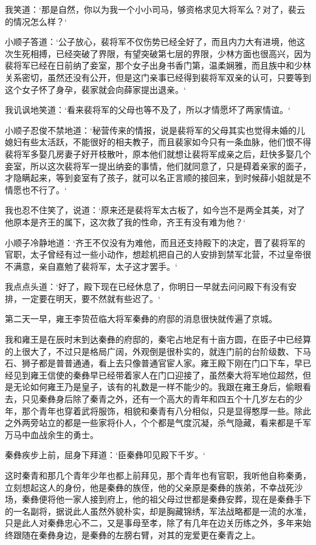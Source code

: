 我笑道：‘那是自然，你以为我一个小小司马，够资格求见大将军么？对了，裴云的情况怎么样？‘

小顺子答道：‘公子放心，裴将军不仅伤势已经全好了，而且内力大有进境，他这次生死相搏，已经突破了界限，有望突破第七层的界限，少林方面也很高兴，因为裴将军已经在日前纳了妾室，那个女子出身书香门第，温柔娴雅，而且族中和少林关系密切，虽然还没有公开，但是这门亲事已经得到裴将军双亲的认可，只要等到这个女子怀了身孕，裴家就会向薛家提出退亲。‘

我讥讽地笑道：‘看来裴将军的父母也等不及了，所以才情愿坏了两家情谊。‘

小顺子忍俊不禁地道：‘秘营传来的情报，说是裴将军的父母其实也觉得未婚的儿媳妇有些太活跃，不能很好的相夫教子，而且裴家如今只有一条血脉，他们恨不得裴将军多娶几房妻子好开枝散叶，原本他们就想让裴将军成亲之后，赶快多娶几个妾室，所以这次裴将军一提出纳妾的事情，他们就同意了，只是碍着亲家的面子，才隐瞒起来，等到妾室有了孩子，就可以名正言顺的接回来，到时候薛小姐就是不情愿也不行了。‘

我也忍不住笑了，说道：‘原来还是裴将军太古板了，如今岂不是两全其美，对了他原本是齐王的属下，这次救了我的性命，齐王有没有难为他？‘

小顺子冷静地道：‘齐王不仅没有为难他，而且还支持殿下的决定，晋了裴将军的官职，太子曾经有过一些小动作，想趁机把自己的人安排到禁军北营，不过皇帝很不满意，亲自嘉勉了裴将军，太子这才罢手。‘

我点点头道：‘好了，殿下现在已经休息了，你明日一早就去问问殿下有没有安排，一定要在明天，要不然就有些迟了。‘

第二天一早，雍王李贽莅临大将军秦彝的府邸的消息很快就传遍了京城。

我和雍王是在辰时末到达秦彝的府邸的，秦宅占地足有十亩方圆，在臣子中已经算的上很大了，不过只是格局广阔，外观倒是很朴实的，就连门前的台阶级数、下马石、狮子都是普普通通，看上去只像普通官宦人家。雍王殿下刚在门口下车，早已经见到雍王信使的秦彝早已经带着家人在门口迎接了，虽然秦大将军地位超然，但是无论如何雍王乃是皇子，该有的礼数是一样不能少的。我跟在雍王身后，偷眼看去，只见秦彝身后除了秦青之外，还有一个高大的青年和四五个十几岁左右的少年，那个青年也穿着武将服饰，相貌和秦青有八分相似，只是显得憨厚一些。除此之外两旁站立的都是一些家将仆人，个个都是气度沉凝，杀气隐藏，看来都是千军万马中血战余生的勇士。

秦彝疾步上前，屈身下拜道：‘臣秦彝叩见殿下千岁。‘

这时秦青和那几个青年少年也都上前拜见，那个青年也有官职，我听他自称秦勇，立刻想起这人的身份，他是秦彝的族侄，他的父亲原是秦彝的族弟，不幸战死沙场，秦彝便将他一家人接到府上，他的祖父母过世都是秦彝安葬，现在是秦彝手下的一名副将，据说此人虽然外貌朴实，却是胸藏锦绣，军法战略都是一流的水准，只是此人对秦彝忠心不二，又是事母至孝，除了有几年在边关历练之外，多年来始终跟随在秦彝身边，是秦彝的左膀右臂，对其的宠爱更在秦青之上。

